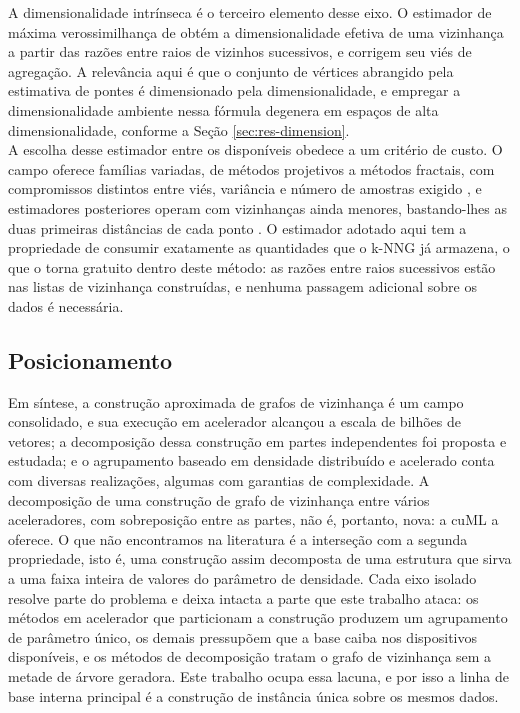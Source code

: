 A dimensionalidade intrínseca é o terceiro elemento desse eixo. O estimador de máxima verossimilhança de  obtém a dimensionalidade efetiva de uma vizinhança a partir das razões entre raios de vizinhos sucessivos, e  corrigem seu viés de agregação. A relevância aqui é que o conjunto de vértices abrangido pela estimativa de pontes é dimensionado pela dimensionalidade, e empregar a dimensionalidade ambiente nessa fórmula degenera em espaços de alta dimensionalidade, conforme a Seção \ref{sec:res-dimension}.\\

A escolha desse estimador entre os disponíveis obedece a um critério de custo. O campo oferece famílias variadas, de métodos projetivos a métodos fractais, com compromissos distintos entre viés, variância e número de amostras exigido \cite{id-estimation}, e estimadores posteriores operam com vizinhanças ainda menores, bastando-lhes as duas primeiras distâncias de cada ponto \cite{twonn}. O estimador adotado aqui tem a propriedade de consumir exatamente as quantidades que o \ac{k-NNG} já armazena, o que o torna gratuito dentro deste método: as razões entre raios sucessivos estão nas listas de vizinhança construídas, e nenhuma passagem adicional sobre os dados é necessária.\\

\subsection{Posicionamento\label{sec:rel-positioning}}

Em síntese, a construção aproximada de grafos de vizinhança é um campo consolidado, e sua execução em acelerador alcançou a escala de bilhões de vetores; a decomposição dessa construção em partes independentes foi proposta e estudada; e o agrupamento baseado em densidade distribuído e acelerado conta com diversas realizações, algumas com garantias de complexidade. A decomposição de uma construção de grafo de vizinhança entre vários aceleradores, com sobreposição entre as partes, não é, portanto, nova: a cuML a oferece. O que não encontramos na literatura é a interseção com a segunda propriedade, isto é, uma construção assim decomposta de uma estrutura que sirva a uma faixa inteira de valores do parâmetro de densidade. Cada eixo isolado resolve parte do problema e deixa intacta a parte que este trabalho ataca: os métodos em acelerador que particionam a construção produzem um agrupamento de parâmetro único, os demais pressupõem que a base caiba nos dispositivos disponíveis, e os métodos de decomposição tratam o grafo de vizinhança sem a metade de árvore geradora. Este trabalho ocupa essa lacuna, e por isso a linha de base interna principal é a construção de instância única sobre os mesmos dados.\\

